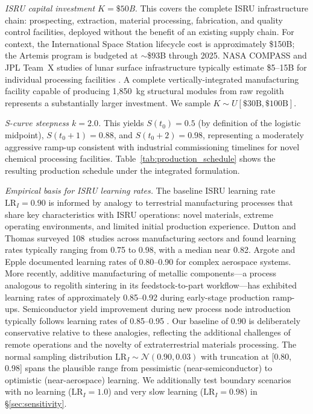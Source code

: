 \documentclass[preprint,12pt]{elsarticle}
\begin{document}
\emph{ISRU capital investment $K = \$50$B.} This covers the complete ISRU infrastructure chain: prospecting, extraction, material processing, fabrication, and quality control facilities, deployed without the benefit of an existing supply chain. For context, the International Space Station lifecycle cost is approximately \$150B; the Artemis program is budgeted at $\sim$\$93B through 2025. NASA COMPASS and JPL Team~X studies of lunar surface infrastructure typically estimate \$5--15B for individual processing facilities \cite{sanders2015,nasa2015handbook}. A complete vertically-integrated manufacturing facility capable of producing 1{,}850~kg structural modules from raw regolith represents a substantially larger investment. We sample $K \sim U[\$30\text{B}, \$100\text{B}]$.

\emph{S-curve steepness $k = 2.0$.} This yields $S(t_0) = 0.5$ (by definition of the logistic midpoint), $S(t_0 + 1) = 0.88$, and $S(t_0 + 2) = 0.98$, representing a moderately aggressive ramp-up consistent with industrial commissioning timelines for novel chemical processing facilities. Table~\ref{tab:production_schedule} shows the resulting production schedule under the integrated formulation.

\emph{Empirical basis for ISRU learning rates.} The baseline ISRU learning rate $\mathrm{LR}_I = 0.90$ is informed by analogy to terrestrial manufacturing processes that share key characteristics with ISRU operations: novel materials, extreme operating environments, and limited initial production experience. Dutton and Thomas \cite{dutton1984} surveyed 108~studies across manufacturing sectors and found learning rates typically ranging from 0.75 to 0.98, with a median near 0.82. Argote and Epple \cite{argote1990} documented learning rates of 0.80--0.90 for complex aerospace systems. More recently, additive manufacturing of metallic components---a process analogous to regolith sintering in its feedstock-to-part workflow---has exhibited learning rates of approximately 0.85--0.92 during early-stage production ramp-ups. Semiconductor yield improvement during new process node introduction typically follows learning rates of 0.85--0.95 \cite{nagy2013}. Our baseline of 0.90 is deliberately conservative relative to these analogies, reflecting the additional challenges of remote operations and the novelty of extraterrestrial materials processing. The normal sampling distribution $\mathrm{LR}_I \sim \mathcal{N}(0.90, 0.03)$ with truncation at [0.80, 0.98] spans the plausible range from pessimistic (near-semiconductor) to optimistic (near-aerospace) learning. We additionally test boundary scenarios with no learning ($\mathrm{LR}_I = 1.0$) and very slow learning ($\mathrm{LR}_I = 0.98$) in \S\ref{sec:sensitivity}.
\end{document}
